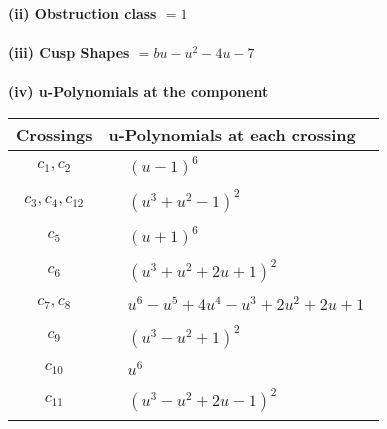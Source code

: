 \documentclass[1p]{elsarticle_modified}
\theoremstyle{definition}
\begin{document}
\flushleft \textbf{(ii) Obstruction class $= 1$}\\~\\
\flushleft \textbf{(iii) Cusp Shapes $= b u- u^2-4 u-7$}\\~\\
\newpage\renewcommand{\arraystretch}{1}
\flushleft \textbf{(iv) u-Polynomials at the component}\newline \\
\begin{tabular}{m{50pt}|m{274pt}}
Crossings & \hspace{64pt}u-Polynomials at each crossing \\
\hline $$\begin{aligned}c_{1},c_{2}\end{aligned}$$&$\begin{aligned}
&(u-1)^6
\end{aligned}$\\
\hline $$\begin{aligned}c_{3},c_{4},c_{12}\end{aligned}$$&$\begin{aligned}
&(u^3+u^2-1)^2
\end{aligned}$\\
\hline $$\begin{aligned}c_{5}\end{aligned}$$&$\begin{aligned}
&(u+1)^6
\end{aligned}$\\
\hline $$\begin{aligned}c_{6}\end{aligned}$$&$\begin{aligned}
&(u^3+u^2+2 u+1)^2
\end{aligned}$\\
\hline $$\begin{aligned}c_{7},c_{8}\end{aligned}$$&$\begin{aligned}
&u^6- u^5+4 u^4- u^3+2 u^2+2 u+1
\end{aligned}$\\
\hline $$\begin{aligned}c_{9}\end{aligned}$$&$\begin{aligned}
&(u^3- u^2+1)^2
\end{aligned}$\\
\hline $$\begin{aligned}c_{10}\end{aligned}$$&$\begin{aligned}
&u^6
\end{aligned}$\\
\hline $$\begin{aligned}c_{11}\end{aligned}$$&$\begin{aligned}
&(u^3- u^2+2 u-1)^2
\end{aligned}$\\
\hline
\end{tabular}\\~\\
\end{document}
